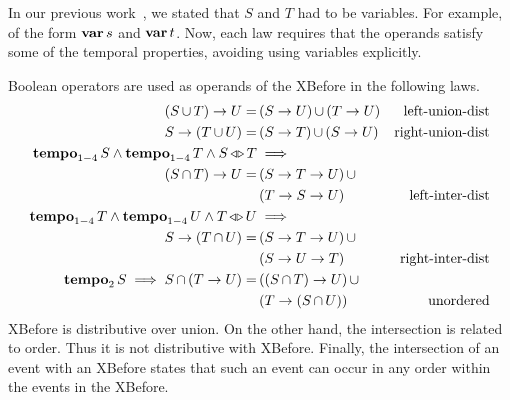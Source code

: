 \documentclass[en,twoside,onehalfspacing,phd]{risethesis}
\def\varop{\ensuremath\operatorname{\mathbf{var}}}
\newcommand{\var}[1]{\ensuremath\varop #1}
\def\xbeforeop{\ensuremath\rightarrow}
\newcommand{\xbefore}[2]{\ensuremath #1 \xbeforeop #2 }
\def\tempoop{\ensuremath\operatorname{\mathbf{tempo}}}
\newcommand{\tempo}[2][1-4]{\ensuremath\tempoop_{#1} #2}
\def\independenteventsop{\ensuremath\operatorname{\triangleleft\triangleright}}
\newcommand{\independentevents}[2]{\ensuremath #1 \independenteventsop #2}
\newcommand{\parsin}[1]{\ensuremath\left( #1 \right)}
\def\union{\ensuremath\operatorname{\cup}}
\def\inter{\ensuremath\operatorname{\cap}}
\begin{document}
In our previous work~\cite{DM2015}, we stated that $S$ and $T$ had to be variables.
For example, of the form $\var{s}$ and $\var{t}$.
Now, each law requires that the operands satisfy some of the temporal properties, avoiding using variables explicitly.

Boolean operators are used as operands of the XBefore in the following laws.
%
\begin{subequations}
\begin{align}
\xbefore{\left(S \union T\right)}{U} =&
  \parsin{\xbefore{S}{U}} \union \parsin{\xbefore{T}{U}} &
  \text{left-union-dist}
  \label{thm:xbefore-sup-1}\\
%
\xbefore{S}{\left(T \union U\right)} =&
  \parsin{\xbefore{S}{T}} \union \parsin{\xbefore{S}{U}} &
  \text{right-union-dist}
  \label{thm:xbefore-sup-2}\\
%
\tempo{S} \land \tempo{T} \land \independentevents{S}{T} & \implies\nonumber \\
  \xbefore{\left(S \inter T\right)}{U} =&
  \parsin{\xbefore{\xbefore{S}{T}}{U}} \union \nonumber\\
  &\parsin{\xbefore{\xbefore{T}{S}}{U}} &
  \text{left-inter-dist}
  \label{thm:xbefore-inf-1}\\
%
\tempo{T} \land \tempo{U} \land \independentevents{T}{U} & \implies \nonumber\\
  \xbefore{S}{\left(T \inter U\right)} =&
  \parsin{\xbefore{S}{\xbefore{T}{U}}} \union \nonumber\\
  &\parsin{\xbefore{S}{\xbefore{U}{T}}} &
  \text{right-inter-dist}
  \label{thm:xbefore-inf-2}\\
%
\tempo[2]{S} \implies S \inter \parsin{\xbefore{T}{U}} =&
  \parsin{\xbefore{\parsin{S \inter T}}{U}} \union \nonumber\\
  &\parsin{\xbefore{T}{\parsin{S \inter U}}} &
  \text{unordered}
  \label{thm:and_xbefore_equiv_or_xbefore}
\end{align}
\end{subequations}
%
XBefore is distributive over union.
On the other hand, the intersection is related to order.
Thus it is not distributive with XBefore.
Finally, the intersection of an event with an XBefore states that such an event can occur in any order within the events in the XBefore.
\end{document}
